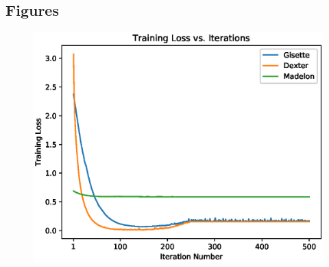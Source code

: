 \documentclass[UTF8]{article}
\begin{document}
\subsection{Figures}
\begin{figure}[H]
    \centering
    \includegraphics[scale=0.95]{./figures/graph.eps}
\end{figure}

\newpage
\end{document}
